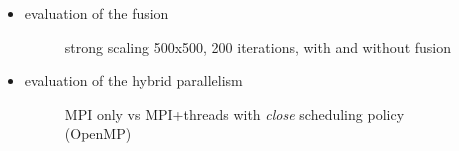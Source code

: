\documentclass[twocolumn]{svjour3}          %
\begin{document}
\begin{itemize}
\item evaluation of the fusion

\begin{figure}[!h]\begin{center}
  \caption{strong scaling 500x500, 200 iterations, with and without fusion}
  \label{fig:mesh}
\end{center}\end{figure}

\item evaluation of the hybrid parallelism

\begin{figure}[!h]\begin{center}
  \caption{MPI only vs MPI+threads with \emph{close} scheduling policy (OpenMP)}
  \label{fig:mesh}
\end{center}\end{figure}


\end{itemize}
\end{document}
